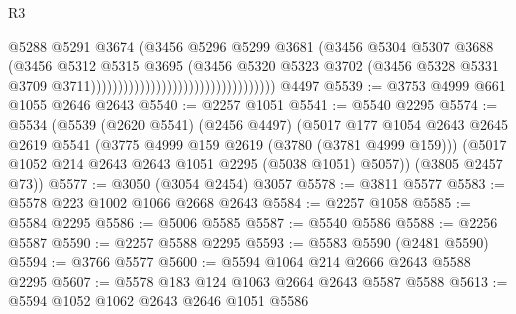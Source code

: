 \begin{lexlean}{R3}
\begin{coremodule}
                                                              @5288
                                                              @5291
                                                              @3674
                                                              (@3456
                                                                @5296
                                                                @5299
                                                                @3681
                                                                (@3456
                                                                  @5304
                                                                  @5307
                                                                  @3688
                                                                  (@3456
                                                                    @5312
                                                                    @5315
                                                                    @3695
                                                                    (@3456
                                                                      @5320
                                                                      @5323
                                                                      @3702
                                                                      (@3456
                                                                        @5328
                                                                        @5331
                                                                        @3709
                                                                        @3711))))))))))))))))))))))))))))))))))
    @4497
@5539 := @3753 @4999 @661 @1055 @2646 @2643
@5540 := @2257 @1051
@5541 := @5540 @2295
@5574 := @5534
    (@5539
      (@2620 @5541)
      (@2456 @4497)
      (@5017
        @177
        @1054
        @2643
        @2645
        @2619
        @5541
        (@3775 @4999 @159 @2619 (@3780 (@3781 @4999 @159)))
        (@5017 @1052 @214 @2643 @2643 @1051 @2295 (@5038 @1051) @5057))
      (@3805 @2457 @73))
@5577 := @3050 (@3054 @2454) @3057
@5578 := @3811 @5577
@5583 := @5578 @223 @1002 @1066 @2668 @2643
@5584 := @2257 @1058
@5585 := @5584 @2295
@5586 := @5006 @5585
@5587 := @5540 @5586
@5588 := @2256 @5587
@5590 := @2257 @5588 @2295
@5593 := @5583 @5590 (@2481 @5590)
@5594 := @3766 @5577
@5600 := @5594 @1064 @214 @2666 @2643 @5588 @2295
@5607 := @5578 @183 @124 @1063 @2664 @2643 @5587 @5588
@5613 := @5594 @1052 @1062 @2643 @2646 @1051 @5586

\end{coremodule}
\end{lexlean}
